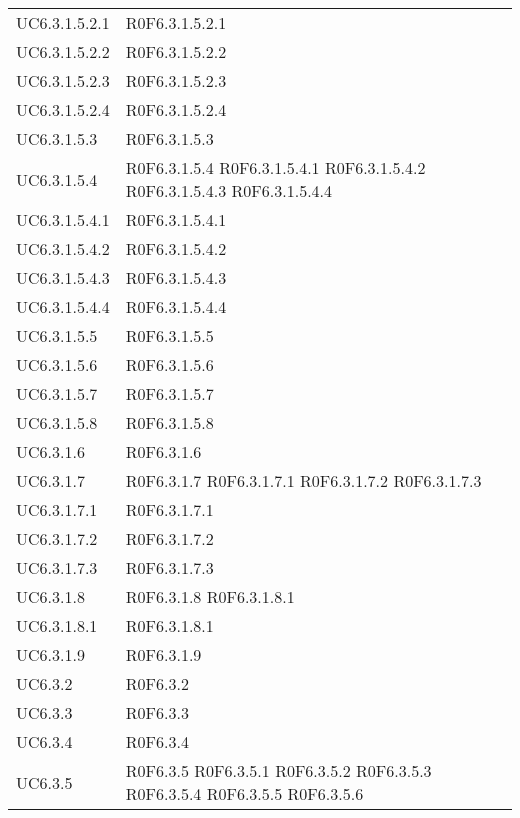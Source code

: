 \begin{longtable}{p{2.5cm}!{\VRule[1pt]}p{5.5cm}}
UC6.3.1.5.2.1 & R0F6.3.1.5.2.1\\
UC6.3.1.5.2.2 & R0F6.3.1.5.2.2\\
UC6.3.1.5.2.3 & R0F6.3.1.5.2.3\\
UC6.3.1.5.2.4 & R0F6.3.1.5.2.4\\
UC6.3.1.5.3 & R0F6.3.1.5.3\\
UC6.3.1.5.4 & R0F6.3.1.5.4
	\newline R0F6.3.1.5.4.1
	\newline R0F6.3.1.5.4.2
	\newline R0F6.3.1.5.4.3
	\newline R0F6.3.1.5.4.4\\
UC6.3.1.5.4.1 & R0F6.3.1.5.4.1\\
UC6.3.1.5.4.2 & R0F6.3.1.5.4.2\\
UC6.3.1.5.4.3 & R0F6.3.1.5.4.3\\
UC6.3.1.5.4.4 & R0F6.3.1.5.4.4\\
UC6.3.1.5.5 & R0F6.3.1.5.5\\
UC6.3.1.5.6 & R0F6.3.1.5.6\\
UC6.3.1.5.7 & R0F6.3.1.5.7\\
UC6.3.1.5.8 & R0F6.3.1.5.8\\
UC6.3.1.6 & R0F6.3.1.6\\
UC6.3.1.7 & R0F6.3.1.7
	\newline R0F6.3.1.7.1
	\newline R0F6.3.1.7.2
	\newline R0F6.3.1.7.3\\
UC6.3.1.7.1 & R0F6.3.1.7.1\\
UC6.3.1.7.2 & R0F6.3.1.7.2\\
UC6.3.1.7.3 & R0F6.3.1.7.3\\
UC6.3.1.8 & R0F6.3.1.8
	\newline R0F6.3.1.8.1\\
UC6.3.1.8.1 & R0F6.3.1.8.1\\
UC6.3.1.9 & R0F6.3.1.9\\
UC6.3.2 & R0F6.3.2\\
UC6.3.3 & R0F6.3.3\\
UC6.3.4 & R0F6.3.4\\
UC6.3.5 & R0F6.3.5
	\newline R0F6.3.5.1
	\newline R0F6.3.5.2
	\newline R0F6.3.5.3
	\newline R0F6.3.5.4
	\newline R0F6.3.5.5
	\newline R0F6.3.5.6

\end{longtable}
